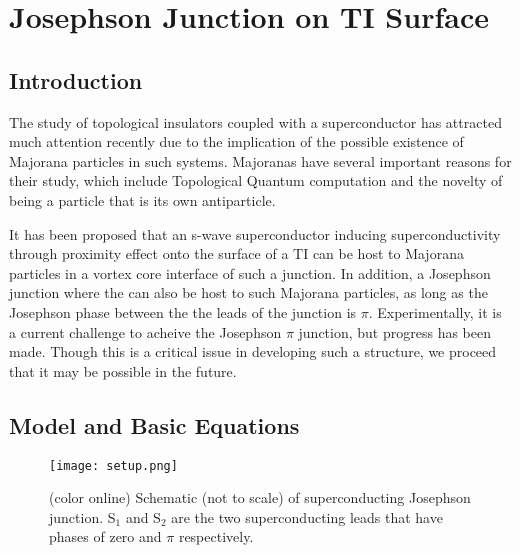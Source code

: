 \documentclass[11pt]{report}
\begin{document}
\chapter{Josephson Junction on TI Surface}
\section{Introduction}
The study of topological insulators coupled with a superconductor has attracted much attention recently due to the implication of the possible existence of Majorana particles in such systems. Majoranas have several important reasons for their study, which include Topological Quantum computation and the novelty of being a particle that is its own antiparticle.

It has been proposed that an s-wave superconductor inducing superconductivity through proximity effect onto the surface of a TI can be host to Majorana particles in a vortex core interface of such a junction. In addition, a Josephson junction where the can also be host to 
such Majorana particles, as long as the Josephson phase between the the leads of the junction is $\pi$. Experimentally, it is a current challenge to acheive the Josephson $\pi$ junction, but progress has been made. Though this is a critical issue in developing such a structure, we proceed that it may be possible in the future. 
\section{Model and Basic Equations}

\begin{figure}
\center
\texttt{[image: setup.png]}
\caption{(color online) Schematic (not to scale) of superconducting Josephson junction. S$_1$ and S$_2$ are the two superconducting leads that have phases of zero and $\pi$ respectively. 
}\label{setup}
\end{figure}
\end{document}
